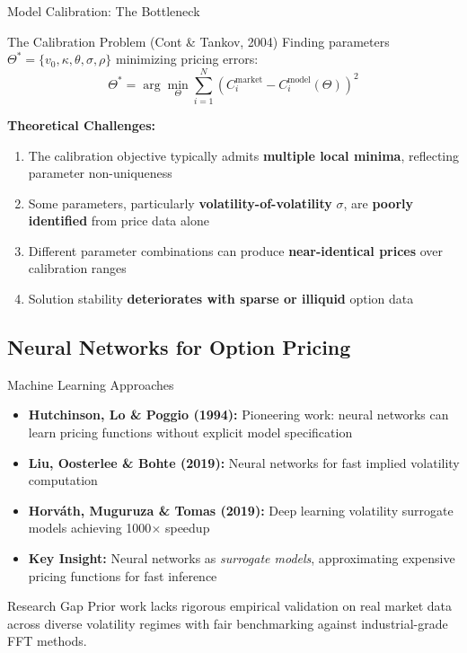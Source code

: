 \documentclass{beamer}
\begin{document}
\begin{frame}{Model Calibration: The Bottleneck}
    \begin{block}{The Calibration Problem (Cont \& Tankov, 2004)}
        Finding parameters $\Theta^* = \{v_0, \kappa, \theta, \sigma, \rho\}$ minimizing pricing errors:
        \begin{equation}
            \Theta^* = \arg\min_\Theta \sum_{i=1}^N \left(C_i^{\text{market}} - C_i^{\text{model}}(\Theta)\right)^2
        \end{equation}
    \end{block}
    \footnotesize
    \textbf{Theoretical Challenges:}
    \begin{enumerate}
        \item The calibration objective typically admits \textbf{multiple local minima}, reflecting parameter non-uniqueness
        \item Some parameters, particularly \textbf{volatility-of-volatility} $\sigma$, are \textbf{poorly identified} from price data alone
        \item Different parameter combinations can produce \textbf{near-identical prices} over calibration ranges
        \item Solution stability \textbf{deteriorates with sparse or illiquid} option data
    \end{enumerate}
\end{frame}

\subsection{Neural Networks for Option Pricing}

\begin{frame}{Machine Learning Approaches}
    \begin{itemize}
        \item \textbf{Hutchinson, Lo \& Poggio (1994):} Pioneering work: neural networks can learn pricing functions without explicit model specification
        \item \textbf{Liu, Oosterlee \& Bohte (2019):} Neural networks for fast implied volatility computation
        \item \textbf{Horváth, Muguruza \& Tomas (2019):} Deep learning volatility surrogate models achieving 1000$\times$ speedup
        \item \textbf{Key Insight:} Neural networks as \textit{surrogate models}, approximating expensive pricing functions for fast inference
    \end{itemize}

    \vspace{0.3cm}

    \begin{alertblock}{Research Gap}
        Prior work lacks rigorous empirical validation on real market data across diverse volatility regimes with fair benchmarking against industrial-grade FFT methods.
    \end{alertblock}
\end{frame}
\end{document}
